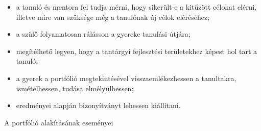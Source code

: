 \begin{itemize}
      \item a tanuló és mentora fel tudja mérni, hogy sikerült-e a kitűzött
            célokat
            elérni, illetve mire van szüksége még a tanulónak új célok
            eléréséhez;

      \item a szülő folyamatosan rálásson a gyereke tanulási útjára;

      \item megítélhető legyen, hogy a tantárgyi fejlesztési területekhez
            képest
            hol
            tart a tanuló;

      \item a gyerek a portfólió megtekintésével visszaemlékezhessen a
            tanultakra,
            ismételhessen, tudása elmélyülhessen;

      \item eredményei alapján bizonyítványt lehessen kiállítani.

\end{itemize}
A portfólió alakításának eseményei
